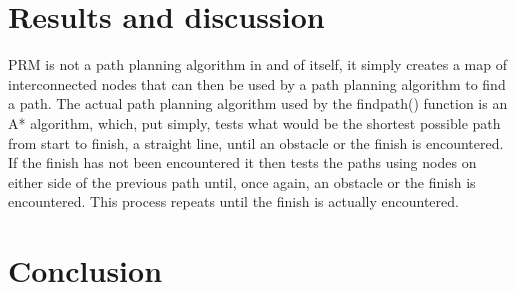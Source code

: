 \documentclass{ieeeaccess}
\begin{document}
\section{Results and discussion}
\label{sec:res}

PRM is not a path planning algorithm in and of itself, it simply creates a map of interconnected nodes that can then be used by a path planning algorithm to find a path. The actual path planning algorithm used by the findpath() function is an A* algorithm, which, put simply, tests what would be the shortest possible path from start to finish, a straight line, until an obstacle or the finish is encountered. If the finish has not been encountered it then tests the paths using nodes on either side of the previous path until, once again, an obstacle or the finish is encountered. This process repeats until the finish is actually encountered.\par
\section{Conclusion}
\label{sec:con}

\EOD
\end{document}
